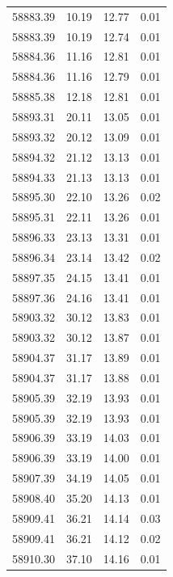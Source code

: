 \begin{longtable}{|c|c|c|c|}
 58883.39 &   10.19 &       12.77 &          0.01 \\
 58883.39 &   10.19 &       12.74 &          0.01 \\
 58884.36 &   11.16 &       12.81 &          0.01 \\
 58884.36 &   11.16 &       12.79 &          0.01 \\
 58885.38 &   12.18 &       12.81 &          0.01 \\
 58893.31 &   20.11 &       13.05 &          0.01 \\
 58893.32 &   20.12 &       13.09 &          0.01 \\
 58894.32 &   21.12 &       13.13 &          0.01 \\
 58894.33 &   21.13 &       13.13 &          0.01 \\
 58895.30 &   22.10 &       13.26 &          0.02 \\
 58895.31 &   22.11 &       13.26 &          0.01 \\
 58896.33 &   23.13 &       13.31 &          0.01 \\
 58896.34 &   23.14 &       13.42 &          0.02 \\
 58897.35 &   24.15 &       13.41 &          0.01 \\
 58897.36 &   24.16 &       13.41 &          0.01 \\
 58903.32 &   30.12 &       13.83 &          0.01 \\
 58903.32 &   30.12 &       13.87 &          0.01 \\
 58904.37 &   31.17 &       13.89 &          0.01 \\
 58904.37 &   31.17 &       13.88 &          0.01 \\
 58905.39 &   32.19 &       13.93 &          0.01 \\
 58905.39 &   32.19 &       13.93 &          0.01 \\
 58906.39 &   33.19 &       14.03 &          0.01 \\
 58906.39 &   33.19 &       14.00 &          0.01 \\
 58907.39 &   34.19 &       14.05 &          0.01 \\
 58908.40 &   35.20 &       14.13 &          0.01 \\
 58909.41 &   36.21 &       14.14 &          0.03 \\
 58909.41 &   36.21 &       14.12 &          0.02 \\
 58910.30 &   37.10 &       14.16 &          0.01 \\

\end{longtable}
